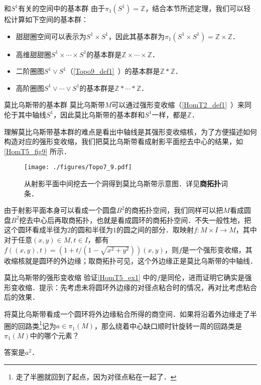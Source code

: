 \begin{example}{和$S^1$有关的空间中的基本群}
由于$\pi_1(S^1)=\mathbb{Z}$，结合本节所述定理，我们可以轻松计算如下空间的基本群：
\begin{itemize}
\item 甜甜圈空间可以表示为$S^1\times S^1$，因此其基本群为$\pi_1(S^1\times S^1)=\mathbb{Z}\times\mathbb{Z}$．
\item 高维甜甜圈$S^1\times\cdots\times S^1$的基本群是$\mathbb{Z}\times\cdots\times\mathbb{Z}$．
\item 二阶圈图$S^1\vee S^1$（\autoref{Topo9_def1}~）的基本群是$\mathbb{Z}*\mathbb{Z}$．
\item 高阶圈图$S^1\vee\cdots\vee S^1$的基本群是$\mathbb{Z}*\cdots*\mathbb{Z}$．
\end{itemize}

\end{example}

\begin{example}{莫比乌斯带的基本群}\label{HomT5_ex1}
莫比乌斯带$M$可以通过强形变收缩（\autoref{HomT2_def1}~）来同伦于其中轴线$S^1$，因此莫比乌斯带的基本群和$S^1$一样，都是$\mathbb{Z}$．

理解莫比乌斯带基本群的难点是看出中轴线是其强形变收缩核，为了方便描述如何构造对应的强形变收缩，我们把莫比乌斯带看成射影平面挖去中心的结果，如\autoref{HomT5_fig9} 所示．

\begin{figure}[ht]
\centering
\texttt{[image: ./figures/Topo7\_9.pdf]}
\caption{从射影平面中间挖去一个洞得到莫比乌斯带示意图．详见\textbf{商拓扑}词条．} \label{HomT5_fig9}
\end{figure}

由于射影平面本身可以看成一个圆盘$B^2$的商拓扑空间，我们同样可以把$M$看成圆盘$B^2$挖去中心后再取商拓扑，也就是看成圆环的商拓扑空间．不失一般性地，把这个圆环看成半径为$2$的圆和半径为$1$的圆之间的部分．取映射$f:M\times I\rightarrow M$，其中对于任意$(x, y)\in M, t\in I$，都有$f((x, y), t)= (1+t/(1-\sqrt{x^2+y^2}))(x, y)$，则$f$是一个强形变收缩，其收缩核就是圆环的外边缘；取商拓扑可见，这个外边缘正是莫比乌斯带的中轴线．
\end{example}

\begin{exercise}{莫比乌斯带的强形变收缩}
验证\autoref{HomT5_ex1} 中的$f$是同伦，进而证明它确实是强形变收缩．提示：先考虑未将圆环外边缘的对径点粘合时的情况，再对比考虑粘合后的效果．
\end{exercise}

\begin{exercise}{}
将莫比乌斯带看成一个圆环将外边缘粘合所得的商空间．如果将沿着外边缘走了半圈的回路类\footnote{走了半圈就回到了起点，因为对径点粘在一起了．}记为$a\in\pi_1(M)$，那么绕着中心缺口顺时针旋转一周的回路类是$\pi_1(M)$中的哪个元素？

答案是$a^2$．
\end{exercise}



